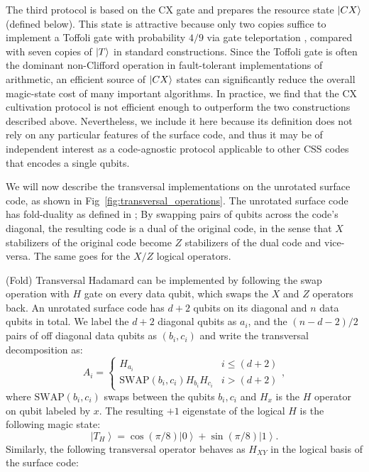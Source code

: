 \documentclass[twocolumn,notitlepage,nofootinbib,floatfix,superscriptaddress]{revtex4-1}
\begin{document}
The third protocol is based on the $\mathrm{CX}$ gate and prepares the resource state $\ket{CX}$ (defined below). This state is attractive because only two copies suffice to implement a Toffoli gate with probability $4/9$ via gate teleportation \cite{dennis2001toward,gupta2024encoding}, compared with seven copies of $\ket{T}$ in standard constructions. Since the Toffoli gate is often the dominant non-Clifford operation in fault-tolerant implementations of arithmetic, an efficient source of $\ket{CX}$ states can significantly reduce the overall magic-state cost of many important algorithms. In practice, we find that the $\mathrm{CX}$ cultivation protocol is not efficient enough to outperform the two constructions described above. Nevertheless, we include it here because its definition does not rely on any particular features of the surface code, and thus it may be of independent interest as a code-agnostic protocol applicable to other CSS codes that encodes a single qubits.

We will now describe the transversal implementations on the unrotated surface code, as shown in Fig~\ref{fig:transversal_operations}. The unrotated surface code has fold-duality as defined in \cite{chen2025efficient}; By swapping pairs of qubits across the code's diagonal, the resulting code is a dual of the original code, in the sense that $X$ stabilizers of the original code become $Z$ stabilizers of the dual code and vice-versa. The same goes for the $X/Z$ logical operators.

(Fold) Transversal Hadamard can be implemented by following the swap operation with $H$ gate on every data qubit, which swaps the $X$ and $Z$ operators back. An unrotated surface code has $d+2$ qubits on its diagonal and $n$ data qubits in total. We label the $d+2$ diagonal qubits as $a_i$, and the  $(n-d-2)/2$ pairs of off diagonal data qubits as $(b_i,c_i)$ and write the transversal decomposition as:
$$
A_{i}=\begin{cases}
H_{a_{i}} & i\le \left(d+2\right)\\
\text{SWAP}\left(b_{i},c_{i}\right)H_{b_{i}} H_{c_{i}} & i > \left(d+2\right)
\end{cases},
$$
where $\text{SWAP}(b_i,c_i)$ swaps between the qubits $b_i,c_i$ and $H_x$ is the $H$ operator on qubit labeled by $x$. The resulting $+1$ eigenstate of the logical $H$ is the following magic state:
$$\left|T_{H}\right>=\cos\left(\pi/8\right)\left|0\right>+\sin\left(\pi/8\right)\left|1\right>.$$
Similarly, the following transversal operator behaves as $H_{XY}$ in the logical basis of the surface code:
\end{document}
